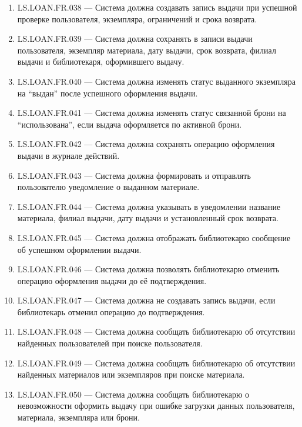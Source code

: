 \documentclass[12pt,a4paper]{article}
\begin{document}
\begin{enumerate}
		\item LS.LOAN.FR.038 --- Система должна создавать запись выдачи при успешной
		проверке пользователя, экземпляра, ограничений и срока возврата.
		
		\item LS.LOAN.FR.039 --- Система должна сохранять в записи выдачи пользователя,
		экземпляр материала, дату выдачи, срок возврата, филиал выдачи и библиотекаря,
		оформившего выдачу.
		
		\item LS.LOAN.FR.040 --- Система должна изменять статус выданного экземпляра на
		``выдан'' после успешного оформления выдачи.
		
		\item LS.LOAN.FR.041 --- Система должна изменять статус связанной брони на
		``использована'', если выдача оформляется по активной брони.
		
		\item LS.LOAN.FR.042 --- Система должна сохранять операцию оформления выдачи
		в журнале действий.
		
		\item LS.LOAN.FR.043 --- Система должна формировать и отправлять пользователю
		уведомление о выданном материале.
		
		\item LS.LOAN.FR.044 --- Система должна указывать в уведомлении название
		материала, филиал выдачи, дату выдачи и установленный срок возврата.
		
		\item LS.LOAN.FR.045 --- Система должна отображать библиотекарю сообщение об
		успешном оформлении выдачи.
		
		\item LS.LOAN.FR.046 --- Система должна позволять библиотекарю отменить
		операцию оформления выдачи до её подтверждения.
		
		\item LS.LOAN.FR.047 --- Система должна не создавать запись выдачи, если
		библиотекарь отменил операцию до подтверждения.
		
		\item LS.LOAN.FR.048 --- Система должна сообщать библиотекарю об отсутствии
		найденных пользователей при поиске пользователя.
		
		\item LS.LOAN.FR.049 --- Система должна сообщать библиотекарю об отсутствии
		найденных материалов или экземпляров при поиске материала.
		
		\item LS.LOAN.FR.050 --- Система должна сообщать библиотекарю о невозможности
		оформить выдачу при ошибке загрузки данных пользователя, материала, экземпляра
		или брони.
		

\end{enumerate}
\end{document}
